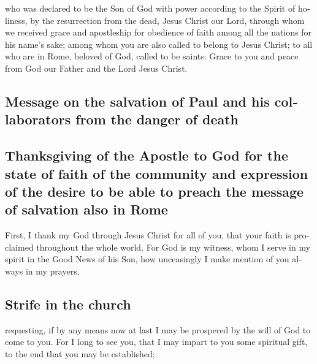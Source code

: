 \begin{paracol}{2}
\begin{otherlanguage}{english}
 who was declared to be the Son of God with power
according to the Spirit of holiness, by the resurrection from the dead,
Jesus Christ our Lord,  through whom we received grace and
apostleship for obedience of faith among all the nations for his name's
sake;  among whom you are also called to belong to Jesus
Christ;  to all who are in Rome, beloved of God, called to
be saints: Grace to you and peace from God our Father and the Lord Jesus
Christ.

\hypertarget{message-on-the-salvation-of-paul-and-his-collaborators-from-the-danger-of-death}{%
\subsection{Message on the salvation of Paul and his collaborators from
the danger of
death}\label{message-on-the-salvation-of-paul-and-his-collaborators-from-the-danger-of-death}}

\hypertarget{thanksgiving-of-the-apostle-to-god-for-the-state-of-faith-of-the-community-and-expression-of-the-desire-to-be-able-to-preach-the-message-of-salvation-also-in-rome}{%
\subsection{Thanksgiving of the Apostle to God for the state of faith of
the community and expression of the desire to be able to preach the
message of salvation also in
Rome}\label{thanksgiving-of-the-apostle-to-god-for-the-state-of-faith-of-the-community-and-expression-of-the-desire-to-be-able-to-preach-the-message-of-salvation-also-in-rome}}

 First, I thank my God through Jesus Christ for all of
you, that your faith is proclaimed throughout the whole world.
 For God is my witness, whom I serve in my spirit in the
Good News of his Son, how unceasingly I make mention of you always in my
prayers,

\hypertarget{strife-in-the-church}{%
\subsection{Strife in the church}\label{strife-in-the-church}}

 requesting, if by any means now at last I may be
prospered by the will of God to come to you.  For I long
to see you, that I may impart to you some spiritual gift, to the end
that you may be established;


\end{otherlanguage}
\end{paracol}
